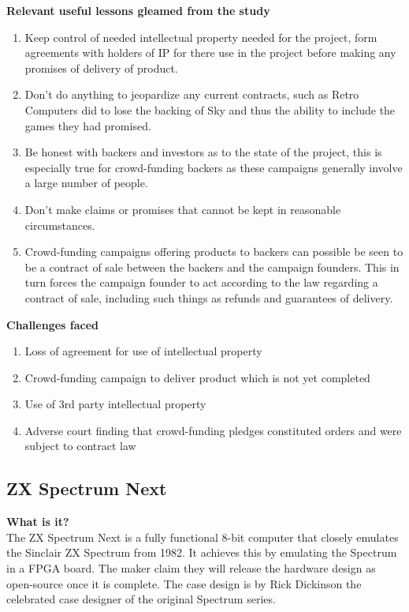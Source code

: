 \textbf{Relevant useful lessons gleamed from the study}
\begin{enumerate}
\item Keep control of needed intellectual property needed for the project, form agreements with holders of IP for there use in the project before making any promises of delivery of product. 
\item Don't do anything to jeopardize any current contracts, such as Retro Computers did to lose the backing of Sky and thus the ability to include the games they had promised.
\item Be honest with backers and investors as to the state of the project, this is especially true for crowd-funding backers as these campaigns generally involve a large number of people.
\item Don't make claims or promises that cannot be kept in reasonable circumstances.
\item Crowd-funding campaigns offering products to backers can possible be seen to be a contract of sale between the backers and the campaign founders. This in turn forces the campaign founder to act according to the law regarding a contract of sale, including such things as refunds and guarantees of delivery.
\end{enumerate}

\textbf{Challenges faced}
\begin{enumerate}
\item Loss of agreement for use of intellectual property
\item Crowd-funding campaign to deliver product which is not yet completed 
\item Use of 3rd party intellectual property
  \item Adverse court finding that crowd-funding pledges constituted orders and were subject to contract law
\end{enumerate}

\subsection{ZX Spectrum Next}
\textbf{What is it?}\\
The ZX Spectrum Next is a fully functional 8-bit computer that closely emulates the Sinclair ZX Spectrum from 1982. It achieves this by emulating the Spectrum in a FPGA board. The maker claim they will release the hardware design as open-source once it is complete. The case design is by Rick Dickinson the celebrated case designer of the original Spectrum series.\\ 

